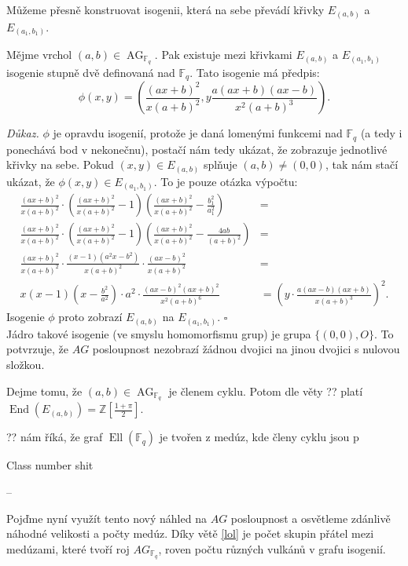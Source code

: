 \documentclass[12pt]{report}
\DeclareMathOperator{\End}{End}
\DeclareMathOperator{\Ell}{Ell}
\DeclareMathOperator{\AG}{AG}
\begin{document}
Můžeme přesně konstruovat isogenii, která na sebe převádí křivky $E_{(a,b)}$ a $E_{(a_1,b_1)}$.
\begin{veta}
Mějme vrchol $(a,b) \in \AG_{\mathbb{F}_q}$. Pak existuje mezi křivkami $E_{(a,b)}$ a $E_{(a_1,b_1)}$ isogenie stupně dvě definovaná nad $\mathbb{F}_q$. Tato isogenie má předpis:
$$\phi(x,y) = \left(\frac{(ax+b)^2}{x (a+b)^2 }, y \frac{a(ax+b)(ax-b)}{x^2 (a+b)^3 } \right).$$
\end{veta}
\noindent \textit{Důkaz.} $\phi$ je opravdu isogenií, protože je daná lomenými funkcemi nad $\mathbb{F}_q$ (a tedy i ponechává bod v nekonečnu), postačí nám tedy ukázat, že zobrazuje jednotlivé křivky na sebe. Pokud $(x,y) \in E_{(a,b)}$ splňuje $(a,b) \neq (0,0)$, tak nám stačí ukázat, že $\phi(x,y) \in E_{(a_1,b_1)}$. To je pouze otázka výpočtu:
\begin{align*}
\frac{(ax+b)^2}{x(a+b)^2 } \cdot \left(\frac{(ax+b)^2}{x(a+b)^2 } - 1 \right) \left(\frac{(ax+b)^2}{x(a+b)^2} - \frac{b_1 ^2}{a_1 ^2} \right) &=\\
\frac{(ax+b)^2}{x(a+b)^2 } \cdot \left(\frac{(ax+b)^2}{x(a+b)^2 } - 1 \right) \left(\frac{(ax+b)^2}{x(a+b)^2 } - \frac{4ab}{(a+b)^2} \right) &=\\
\frac{(ax+b)^2}{x(a+b)^2 } \cdot \frac{(x-1)(a^2 x - b^2)}{x(a+b)^2 } \cdot \frac{(ax-b)^2}{x(a+b)^2 } &=\\
x(x-1)\left(x - \frac{b^2}{a^2} \right) \cdot a^2 \cdot \frac{(ax-b)^2 (ax+b)^2}{x^2 (a+b)^6} &= \left(y \cdot  \frac{a(ax-b)(ax+b)}{x(a+b)^3} \right)^2.
\end{align*} 
Isogenie $\phi$ proto zobrazí $E_{(a,b)}$ na $E_{(a_1,b_1)}$. \hfill $\square$\\

Jádro takové isogenie (ve smyslu homomorfismu grup) je grupa $\lbrace (0,0), O \rbrace $. To potvrzuje, že $AG$ posloupnost nezobrazí žádnou dvojici na jinou dvojici s nulovou složkou.

Dejme tomu, že $(a,b) \in \AG_{\mathbb{F}_q}$ je členem cyklu. Potom dle věty ?? platí $\End(E_{(a,b)}) = \mathbb{Z}\left[\frac{1+\pi}{2} \right]$.  





?? nám říká, že graf $\Ell(\mathbb{F}_q)$ je tvořen z medúz, kde členy cyklu jsou p

Class number shit

--

Pojďme nyní využít tento nový náhled na $AG$ posloupnost a osvětleme zdánlivě náhodné velikosti a počty medúz. Díky větě \ref{lol} je počet skupin přátel mezi medúzami, které tvoří roj $AG_{\mathbb{F}_q}$, roven počtu různých vulkánů v grafu isogenií. 
\end{document}
